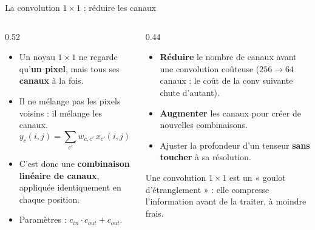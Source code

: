 \begin{frame}{La convolution $1\times1$ : réduire les canaux}
\begin{columns}[t]
\begin{column}{0.52\textwidth}
\begin{itemize}
  \item Un noyau $1\times1$ ne regarde qu'\textbf{un pixel}, mais tous ses
  \textbf{canaux} à la fois.
  \item Il ne mélange pas les pixels voisins : il mélange les canaux.
  \[
    y_c(i,j) = \sum_{c'} w_{c,c'}\,x_{c'}(i,j) + b_c
  \]
  \item C'est donc une \textbf{combinaison linéaire de canaux}, appliquée
  identiquement en chaque position.
  \item Paramètres : $c_{in} \cdot c_{out} + c_{out}$.
\end{itemize}
\end{column}
\begin{column}{0.44\textwidth}
\begin{ebox}
\begin{itemize}
  \item \textbf{Réduire} le nombre de canaux avant une convolution coûteuse
  ($256 \to 64$ canaux : le coût de la conv suivante chute d'autant).
  \item \textbf{Augmenter} les canaux pour créer de nouvelles combinaisons.
  \item Ajuster la profondeur d'un tenseur \textbf{sans toucher} à sa
  résolution.
\end{itemize}
\end{ebox}
\begin{kbox}
Une convolution $1\times1$ est un « goulot d'étranglement » : elle compresse
l'information avant de la traiter, à moindre frais.
\end{kbox}
\end{column}
\end{columns}
\end{frame}


